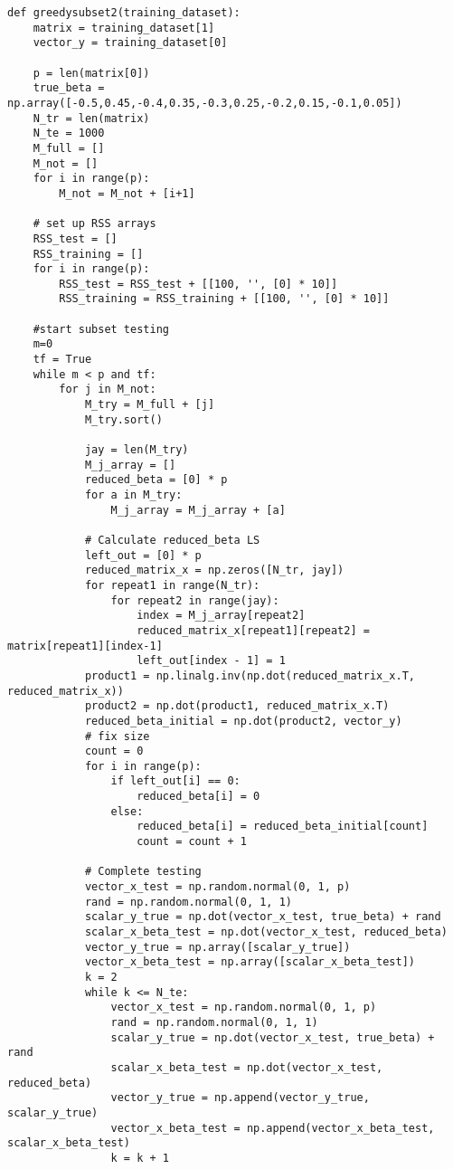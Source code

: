 \documentclass{article}
\begin{document}
\begin{lstlisting}
def greedysubset2(training_dataset):
    matrix = training_dataset[1]
    vector_y = training_dataset[0]

    p = len(matrix[0])
    true_beta = np.array([-0.5,0.45,-0.4,0.35,-0.3,0.25,-0.2,0.15,-0.1,0.05])
    N_tr = len(matrix)
    N_te = 1000
    M_full = []
    M_not = []
    for i in range(p):
        M_not = M_not + [i+1]

    # set up RSS arrays
    RSS_test = []
    RSS_training = []
    for i in range(p):
        RSS_test = RSS_test + [[100, '', [0] * 10]]
        RSS_training = RSS_training + [[100, '', [0] * 10]]

    #start subset testing
    m=0
    tf = True
    while m < p and tf:
        for j in M_not:
            M_try = M_full + [j]
            M_try.sort()

            jay = len(M_try)
            M_j_array = []
            reduced_beta = [0] * p
            for a in M_try:
                M_j_array = M_j_array + [a]

            # Calculate reduced_beta LS
            left_out = [0] * p
            reduced_matrix_x = np.zeros([N_tr, jay])
            for repeat1 in range(N_tr):
                for repeat2 in range(jay):
                    index = M_j_array[repeat2]
                    reduced_matrix_x[repeat1][repeat2] = matrix[repeat1][index-1]
                    left_out[index - 1] = 1
            product1 = np.linalg.inv(np.dot(reduced_matrix_x.T, reduced_matrix_x))
            product2 = np.dot(product1, reduced_matrix_x.T)
            reduced_beta_initial = np.dot(product2, vector_y)
            # fix size
            count = 0
            for i in range(p):
                if left_out[i] == 0:
                    reduced_beta[i] = 0
                else:
                    reduced_beta[i] = reduced_beta_initial[count]
                    count = count + 1

            # Complete testing
            vector_x_test = np.random.normal(0, 1, p)
            rand = np.random.normal(0, 1, 1)
            scalar_y_true = np.dot(vector_x_test, true_beta) + rand
            scalar_x_beta_test = np.dot(vector_x_test, reduced_beta)
            vector_y_true = np.array([scalar_y_true])
            vector_x_beta_test = np.array([scalar_x_beta_test])
            k = 2
            while k <= N_te:
                vector_x_test = np.random.normal(0, 1, p)
                rand = np.random.normal(0, 1, 1)
                scalar_y_true = np.dot(vector_x_test, true_beta) + rand
                scalar_x_beta_test = np.dot(vector_x_test, reduced_beta)
                vector_y_true = np.append(vector_y_true, scalar_y_true)
                vector_x_beta_test = np.append(vector_x_beta_test, scalar_x_beta_test)
                k = k + 1


\end{lstlisting}
\end{document}

